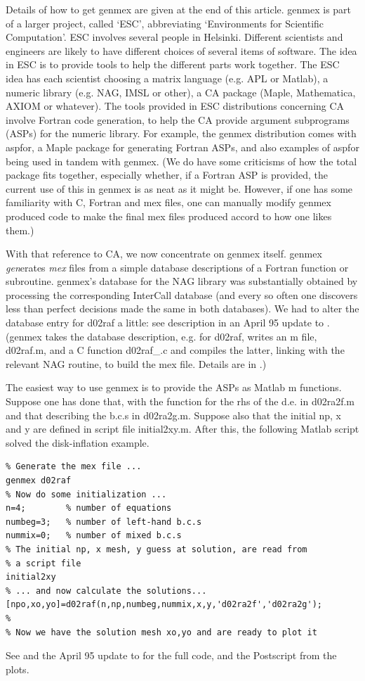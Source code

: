 Details of how to get genmex are given at the end of this article.
genmex is part of a larger project, called `ESC',
abbreviating `Environments for Scientific Computation'.
ESC involves several people in Helsinki.
Different scientists and engineers
are likely to have different choices of several items of software.
The idea in ESC is to provide tools to help the
different parts work together.
The ESC idea has each scientist choosing 
a matrix language (e.g. APL or Matlab), 
a numeric library (e.g. NAG, IMSL or other),
a CA package (Maple, Mathematica, AXIOM or whatever).
The tools provided in ESC distributions concerning CA
involve Fortran code generation, to help the CA
provide argument subprograms (ASPs) for the numeric library.
For example, the genmex distribution comes with aspfor,
a Maple package for generating Fortran ASPs, and also
examples of aspfor being used in tandem with genmex. 
(We do have some criticisms of how the total package fits
together, especially whether, if a Fortran ASP is provided,
the current use of this in genmex is as neat as it might be.
However, if one has some familiarity with C, Fortran and mex files,
one can manually modify genmex produced code to make the final
mex files produced accord to how one likes them.)

With that reference to CA, we now concentrate on
genmex itself.
genmex {\it gen}erates {\it mex} files from a simple
database descriptions of a Fortran function or subroutine.
genmex's database for the NAG library was substantially
obtained by processing the corresponding InterCall database
(and every so often one discovers less than perfect
decisions made the same in both databases).
We had to alter the database entry for d02raf a little:
see description in an April 95 update to \cite{KL}.
(genmex takes the database description, e.g. for d02raf,
writes an m file, d02raf.m, and
a C function d02raf\_.c and compiles the latter,
linking with the relevant NAG routine, to build the mex 
file. Details are in \cite{L}.)

The easiest way to use genmex is to provide the ASPs as
Matlab m functions.
Suppose one has done that, with the function for the
rhs of the d.e. in d02ra2f.m and that describing the b.c.s in
d02ra2g.m. Suppose also that the initial
np, x and y are defined in script file initial2xy.m.
After this, the following Matlab script 
solved the disk-inflation example.
\begin{verbatim}
% Generate the mex file ...
genmex d02raf
% Now do some initialization ...
n=4;        % number of equations
numbeg=3;   % number of left-hand b.c.s
nummix=0;   % number of mixed b.c.s
% The initial np, x mesh, y guess at solution, are read from
% a script file
initial2xy
% ... and now calculate the solutions...
[npo,xo,yo]=d02raf(n,np,numbeg,nummix,x,y,'d02ra2f','d02ra2g');
%
% Now we have the solution mesh xo,yo and are ready to plot it
\end{verbatim}
See \cite{H} and the April 95 update to \cite{KL} for the full code,
and the Postscript from the plots.

